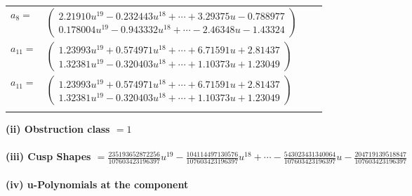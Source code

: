 \documentclass[1p]{elsarticle_modified}
\theoremstyle{definition}
\begin{document}
\begin{tabular}{m{7pt} m{180pt} m{7pt} m{180pt} }
\flushright $a_{8}=$&$\begin{pmatrix}2.21910 u^{19}-0.232443 u^{18}+\cdots+3.29375 u-0.788977\\0.178004 u^{19}-0.943332 u^{18}+\cdots-2.46348 u-1.43324\end{pmatrix}$ \\
\flushright $a_{11}=$&$\begin{pmatrix}1.23993 u^{19}+0.574971 u^{18}+\cdots+6.71591 u+2.81437\\1.32381 u^{19}-0.320403 u^{18}+\cdots+1.10373 u+1.23049\end{pmatrix}$\\ \flushright $a_{11}=$&$\begin{pmatrix}1.23993 u^{19}+0.574971 u^{18}+\cdots+6.71591 u+2.81437\\1.32381 u^{19}-0.320403 u^{18}+\cdots+1.10373 u+1.23049\end{pmatrix}$\\&\end{tabular}
\flushleft \textbf{(ii) Obstruction class $= 1$}\\~\\
\flushleft \textbf{(iii) Cusp Shapes $= \frac{235193652872256}{107603423196397} u^{19}-\frac{104114497130576}{107603423196397} u^{18}+\cdots-\frac{543023431340064}{107603423196397} u-\frac{204719139518847}{107603423196397}$}\\~\\
\newpage\renewcommand{\arraystretch}{1}
\flushleft \textbf{(iv) u-Polynomials at the component}\newline \\
\end{document}
